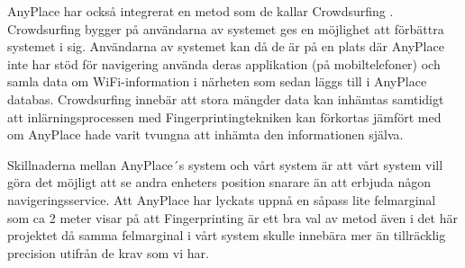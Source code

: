 \documentclass[swedish, a4paper,12pt]{article}
\begin{document}
AnyPlace har också integrerat en metod som de kallar Crowdsurfing \cite{anyplace}. Crowdsurfing bygger på användarna av systemet ges en möjlighet att förbättra systemet i sig. Användarna av systemet kan då de är på en plats där AnyPlace inte har stöd för navigering använda deras applikation (på mobiltelefoner) och samla data om WiFi-information i närheten som sedan läggs till i AnyPlace databas. Crowdsurfing innebär att stora mängder data kan inhämtas samtidigt att inlärningsprocessen med Fingerprintingtekniken kan förkortas jämfört med om AnyPlace hade varit tvungna att inhämta den informationen själva.

Skillnaderna mellan AnyPlace´s system och vårt system är att vårt system vill göra det möjligt att se andra enheters position snarare än att erbjuda någon navigeringsservice. Att AnyPlace har lyckats uppnå en såpass lite felmarginal som ca 2 meter visar på att Fingerprinting är ett bra val av metod även i det här projektet då samma felmarginal i vårt system skulle innebära mer än tillräcklig precision utifrån de krav som vi har.

\end{document}
